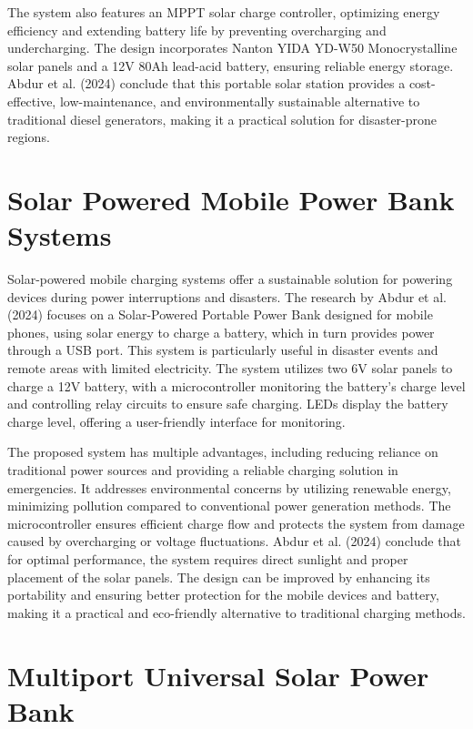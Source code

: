 {The system also features an MPPT solar charge controller, optimizing energy efficiency and extending battery life by preventing overcharging and undercharging. The design incorporates Nanton YIDA YD-W50 Monocrystalline solar panels and a 12V 80Ah lead-acid battery, ensuring reliable energy storage. Abdur et al. (2024) conclude that this portable solar station provides a cost-effective, low-maintenance, and environmentally sustainable alternative to traditional diesel generators, making it a practical solution for disaster-prone regions.

\section{Solar Powered Mobile Power Bank Systems}

Solar-powered mobile charging systems offer a sustainable solution for powering devices during power interruptions and disasters. The research by Abdur et al. (2024) focuses on a Solar-Powered Portable Power Bank designed for mobile phones, using solar energy to charge a battery, which in turn provides power through a USB port. This system is particularly useful in disaster events and remote areas with limited electricity. The system utilizes two 6V solar panels to charge a 12V battery, with a microcontroller monitoring the battery’s charge level and controlling relay circuits to ensure safe charging.  LEDs display the battery charge level, offering a user-friendly interface for monitoring.

The proposed system has multiple advantages, including reducing reliance on traditional power sources and providing a reliable charging solution in emergencies. It addresses environmental concerns by utilizing renewable energy, minimizing pollution compared to conventional power generation methods. The microcontroller ensures efficient charge flow and protects the system from damage caused by overcharging or voltage fluctuations. Abdur et al. (2024) conclude that for optimal performance, the system requires direct sunlight and proper placement of the solar panels. The design can be improved by enhancing its portability and ensuring better protection for the mobile devices and battery, making it a practical and eco-friendly alternative to traditional charging methods.

\section{Multiport Universal Solar Power Bank}

}
